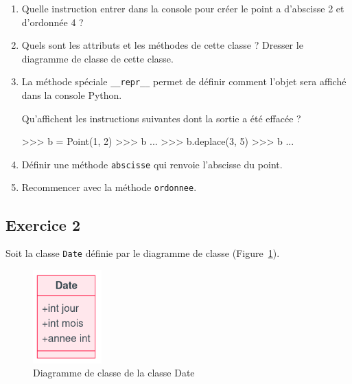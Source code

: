 \documentclass[
  a4paper,
  DIV=11,
  numbers=noendperiod]{scrartcl}
\newenvironment{Shaded}{\begin{snugshade}}{\end{snugshade}}
\newcommand{\DecValTok}[1]{\textcolor[rgb]{0.68,0.00,0.00}{#1}}
\newcommand{\NormalTok}[1]{\textcolor[rgb]{0.00,0.23,0.31}{#1}}
\newcommand{\OperatorTok}[1]{\textcolor[rgb]{0.37,0.37,0.37}{#1}}
\begin{document}
\begin{enumerate}
\def\labelenumi{\arabic{enumi}.}
\item
  Quelle instruction entrer dans la console pour créer le point a
  d'abscisse 2 et d'ordonnée 4 ?
\item
  Quels sont les attributs et les méthodes de cette classe ? Dresser le
  diagramme de classe de cette classe.
\item
  La méthode spéciale \texttt{\_\_repr\_\_} permet de définir comment
  l'objet sera affiché dans la console Python.

  Qu'affichent les instructions suivantes dont la sortie a été effacée ?

\begin{Shaded}
\begin{Highlighting}[]
\OperatorTok{\textgreater{}\textgreater{}\textgreater{}}\NormalTok{ b }\OperatorTok{=}\NormalTok{ Point(}\DecValTok{1}\NormalTok{, }\DecValTok{2}\NormalTok{)}
\OperatorTok{\textgreater{}\textgreater{}\textgreater{}}\NormalTok{ b}
\NormalTok{...}
\OperatorTok{\textgreater{}\textgreater{}\textgreater{}}\NormalTok{ b.deplace(}\DecValTok{3}\NormalTok{, }\DecValTok{5}\NormalTok{)}
\OperatorTok{\textgreater{}\textgreater{}\textgreater{}}\NormalTok{ b}
\NormalTok{...}
\end{Highlighting}
\end{Shaded}
\item
  Définir une méthode \texttt{abscisse} qui renvoie l'abscisse du point.
\item
  Recommencer avec la méthode \texttt{ordonnee}.
\end{enumerate}

\hypertarget{fa-desktop-exercice-2}{%
\subsection{\texorpdfstring{ Exercice
2}{ Exercice 2}}\label{fa-desktop-exercice-2}}

Soit la classe \texttt{Date} définie par le diagramme de classe
(Figure~\ref{fig-classe}).

\begin{figure}[h]

{\centering \includegraphics[width=1.04167in,height=\textheight]{classe_mermaid_exo.png}

}

\caption{\label{fig-classe}Diagramme de classe de la classe Date}

\end{figure}
\end{document}

